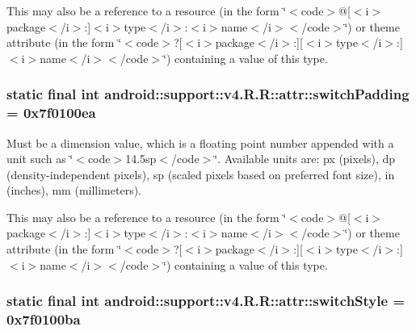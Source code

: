 This may also be a reference to a resource (in the form \char`\"{}$<$code$>$@\mbox{[}$<$i$>$package$<$/i$>$:\mbox{]}$<$i$>$type$<$/i$>$:$<$i$>$name$<$/i$>$$<$/code$>$\char`\"{}) or theme attribute (in the form \char`\"{}$<$code$>$?\mbox{[}$<$i$>$package$<$/i$>$:\mbox{]}\mbox{[}$<$i$>$type$<$/i$>$:\mbox{]}$<$i$>$name$<$/i$>$$<$/code$>$\char`\"{}) containing a value of this type. \hypertarget{classandroid_1_1support_1_1v4_1_1_r_1_1attr_052fde5b4a32a8ac7abe1775ec469774}{
\subsubsection[{switchPadding}]{\setlength{\rightskip}{0pt plus 5cm}static final int android::support::v4.R.R::attr::switchPadding = 0x7f0100ea}}
\label{classandroid_1_1support_1_1v4_1_1_r_1_1attr_052fde5b4a32a8ac7abe1775ec469774}


Must be a dimension value, which is a floating point number appended with a unit such as \char`\"{}$<$code$>$14.5sp$<$/code$>$\char`\"{}. Available units are: px (pixels), dp (density-independent pixels), sp (scaled pixels based on preferred font size), in (inches), mm (millimeters). 

This may also be a reference to a resource (in the form \char`\"{}$<$code$>$@\mbox{[}$<$i$>$package$<$/i$>$:\mbox{]}$<$i$>$type$<$/i$>$:$<$i$>$name$<$/i$>$$<$/code$>$\char`\"{}) or theme attribute (in the form \char`\"{}$<$code$>$?\mbox{[}$<$i$>$package$<$/i$>$:\mbox{]}\mbox{[}$<$i$>$type$<$/i$>$:\mbox{]}$<$i$>$name$<$/i$>$$<$/code$>$\char`\"{}) containing a value of this type. \hypertarget{classandroid_1_1support_1_1v4_1_1_r_1_1attr_a11b0636da523d0daef331a39b6d54de}{
\subsubsection[{switchStyle}]{\setlength{\rightskip}{0pt plus 5cm}static final int android::support::v4.R.R::attr::switchStyle = 0x7f0100ba}}
\label{classandroid_1_1support_1_1v4_1_1_r_1_1attr_a11b0636da523d0daef331a39b6d54de}


